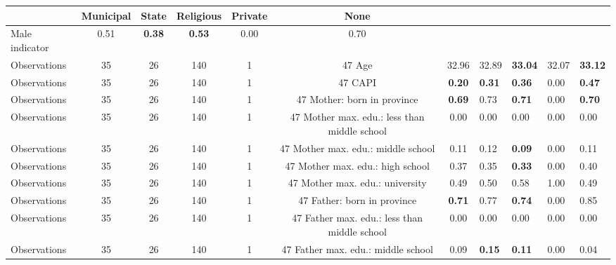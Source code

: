 \begin{tabular}{l c c c c c c }
\toprule
& \textbf{Municipal} & \textbf{State} & \textbf{Religious} & \textbf{Private} & \textbf{None} \\
\midrule
Male indicator &      0.51 & \textbf{     0.38} & \textbf{     0.53} &      0.00 &      0.70 \\
\midrule
Observations &        35 &        26 &       140 &         1 &        47
Age &     32.96 &     32.89 & \textbf{    33.04} &     32.07 & \textbf{    33.12} \\
\midrule
Observations &        35 &        26 &       140 &         1 &        47
CAPI & \textbf{     0.20} & \textbf{     0.31} & \textbf{     0.36} &      0.00 & \textbf{     0.47} \\
\midrule
Observations &        35 &        26 &       140 &         1 &        47
Mother: born in province & \textbf{     0.69} &      0.73 & \textbf{     0.71} &      0.00 & \textbf{     0.70} \\
\midrule
Observations &        35 &        26 &       140 &         1 &        47
Mother max. edu.: less than middle school &      0.00 &      0.00 &      0.00 &      0.00 &      0.00 \\
\midrule
Observations &        35 &        26 &       140 &         1 &        47
Mother max. edu.: middle school &      0.11 &      0.12 & \textbf{     0.09} &      0.00 &      0.11 \\
\midrule
Observations &        35 &        26 &       140 &         1 &        47
Mother max. edu.: high school &      0.37 &      0.35 & \textbf{     0.33} &      0.00 &      0.40 \\
\midrule
Observations &        35 &        26 &       140 &         1 &        47
Mother max. edu.: university &      0.49 &      0.50 &      0.58 &      1.00 &      0.49 \\
\midrule
Observations &        35 &        26 &       140 &         1 &        47
Father: born in province & \textbf{     0.71} &      0.77 & \textbf{     0.74} &      0.00 &      0.85 \\
\midrule
Observations &        35 &        26 &       140 &         1 &        47
Father max. edu.: less than middle school &      0.00 &      0.00 &      0.00 &      0.00 &      0.00 \\
\midrule
Observations &        35 &        26 &       140 &         1 &        47
Father max. edu.: middle school &      0.09 & \textbf{     0.15} & \textbf{     0.11} &      0.00 &      0.04 \\

\end{tabular}
